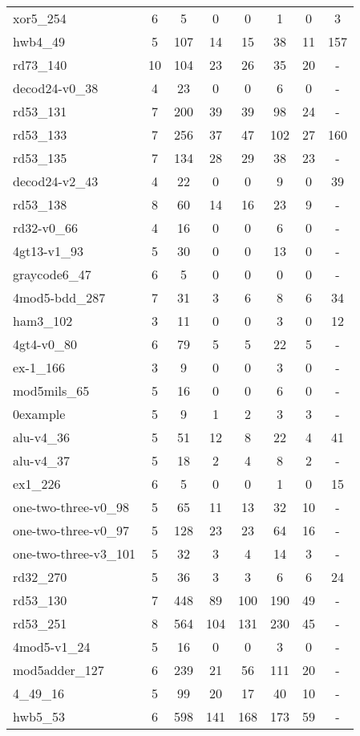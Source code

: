 \documentclass[journal]{IEEEtran}
\begin{document}
\begin{table*}[htbp]
\begin{center}
\begin{tabular}{|p{4.3cm}<{\centering}|c|c|c|c|c|c|c|}
xor5\_254 & 6 & 5 & 0 & 0 & 1 & 0& 3	\\
hwb4\_49 & 5 & 107 & 14 & 15 & 38 & 11& 157 	\\
rd73\_140 & 10 & 104 & 23 & 26 & 35 & 20& - 	\\
decod24-v0\_38 & 4 & 23 & 0 & 0 & 6 & 0& - 	\\
rd53\_131 & 7 & 200 & 39 & 39 & 98 & 24& - 	\\
rd53\_133 & 7 & 256 & 37 & 47 & 102 & 27& 160 	\\
rd53\_135 & 7 & 134 & 28 & 29 & 38 & 23& - 	\\
decod24-v2\_43 & 4 & 22 & 0 & 0 & 9 & 0& 39 \\
rd53\_138 & 8 & 60 & 14 & 16 & 23 & 9& - \\
rd32-v0\_66 & 4 & 16 & 0 & 0 & 6 & 0& - \\
4gt13-v1\_93 & 5 & 30 & 0 & 0 & 13 & 0& - \\
graycode6\_47 & 6 & 5 & 0 & 0 & 0 & 0& - \\
4mod5-bdd\_287 & 7 & 31 & 3 & 6 & 8 & 6& 34 \\
ham3\_102 & 3 & 11 & 0 & 0 & 3 & 0& 12 \\
4gt4-v0\_80 & 6 & 79 & 5 & 5 & 22 & 5& - \\
ex-1\_166 & 3 & 9 & 0 & 0 & 3 & 0& - \\
mod5mils\_65 & 5 & 16 & 0 & 0 & 6 & 0& - \\
0example & 5 & 9 & 1 & 2 & 3 & 3& - \\
alu-v4\_36 & 5 & 51 & 12 & 8 & 22 & 4& 41 \\
alu-v4\_37 & 5 & 18 & 2 & 4 & 8 & 2& - \\
ex1\_226 & 6 & 5 & 0 & 0 & 1 & 0& 15 \\
one-two-three-v0\_98 & 5 & 65 & 11 & 13 & 32 & 10& - \\
one-two-three-v0\_97 & 5 & 128 & 23 & 23 & 64 & 16& - \\
one-two-three-v3\_101 & 5 & 32 & 3 & 4 & 14 & 3& - \\
rd32\_270 & 5 & 36 & 3 & 3 & 6 & 6 &24\\
        rd53\_130 & 7 & 448 & 89 & 100 & 190 & 49& - \\
rd53\_251 & 8 & 564 & 104 & 131 & 230 & 45& - \\
4mod5-v1\_24 & 5 & 16 & 0 & 0 & 3 & 0& - \\
mod5adder\_127 & 6 & 239 & 21 & 56 & 111 & 20& - \\
4\_49\_16 & 5 & 99 & 20 & 17 & 40 & 10& - \\
hwb5\_53 & 6 & 598 & 141 & 168 & 173 & 59& - \\

\end{tabular}
\end{center}
\end{table*}
\end{document}
